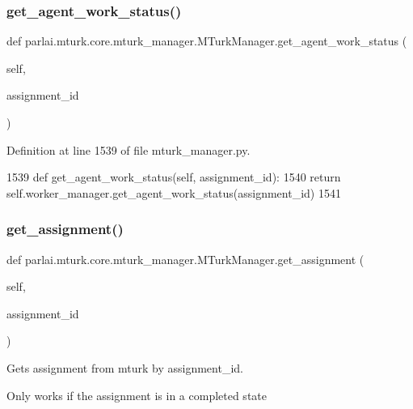 \subsubsection{\texorpdfstring{get\+\_\+agent\+\_\+work\+\_\+status()}{get\_agent\_work\_status()}}
{\footnotesize\ttfamily def parlai.\+mturk.\+core.\+mturk\+\_\+manager.\+M\+Turk\+Manager.\+get\+\_\+agent\+\_\+work\+\_\+status (\begin{DoxyParamCaption}\item[{}]{self,  }\item[{}]{assignment\+\_\+id }\end{DoxyParamCaption})}



Definition at line 1539 of file mturk\+\_\+manager.\+py.


\begin{DoxyCode}
1539     \textcolor{keyword}{def }get\_agent\_work\_status(self, assignment\_id):
1540         \textcolor{keywordflow}{return} self.worker\_manager.get\_agent\_work\_status(assignment\_id)
1541 
\end{DoxyCode}
\mbox{\label{classparlai_1_1mturk_1_1core_1_1mturk__manager_1_1MTurkManager_a986cd32c3359df8228feca69d3ba7637}} 
\subsubsection{\texorpdfstring{get\+\_\+assignment()}{get\_assignment()}}
{\footnotesize\ttfamily def parlai.\+mturk.\+core.\+mturk\+\_\+manager.\+M\+Turk\+Manager.\+get\+\_\+assignment (\begin{DoxyParamCaption}\item[{}]{self,  }\item[{}]{assignment\+\_\+id }\end{DoxyParamCaption})}

\begin{DoxyVerb}Gets assignment from mturk by assignment_id.

Only works if the assignment is in a completed state
\end{DoxyVerb}
 

